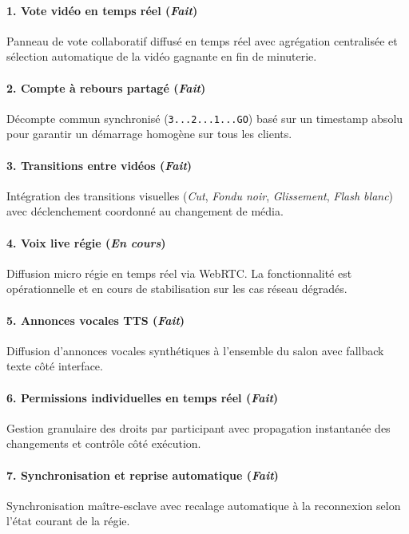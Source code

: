 \documentclass[11pt,a4paper]{report}
\begin{document}
\paragraph{1. Vote vidéo en temps réel (\textit{Fait})}
Panneau de vote collaboratif diffusé en temps réel avec agrégation centralisée et sélection automatique de la vidéo gagnante en fin de minuterie.

\paragraph{2. Compte à rebours partagé (\textit{Fait})}
Décompte commun synchronisé (\texttt{3...2...1...GO}) basé sur un timestamp absolu pour garantir un démarrage homogène sur tous les clients.

\paragraph{3. Transitions entre vidéos (\textit{Fait})}
Intégration des transitions visuelles (\textit{Cut}, \textit{Fondu noir}, \textit{Glissement}, \textit{Flash blanc}) avec déclenchement coordonné au changement de média.

\paragraph{4. Voix live régie (\textit{En cours})}
Diffusion micro régie en temps réel via WebRTC. La fonctionnalité est opérationnelle et en cours de stabilisation sur les cas réseau dégradés.

\paragraph{5. Annonces vocales TTS (\textit{Fait})}
Diffusion d'annonces vocales synthétiques à l'ensemble du salon avec fallback texte côté interface.

\paragraph{6. Permissions individuelles en temps réel (\textit{Fait})}
Gestion granulaire des droits par participant avec propagation instantanée des changements et contrôle côté exécution.

\paragraph{7. Synchronisation et reprise automatique (\textit{Fait})}
Synchronisation maître-esclave avec recalage automatique à la reconnexion selon l'état courant de la régie.
\end{document}
